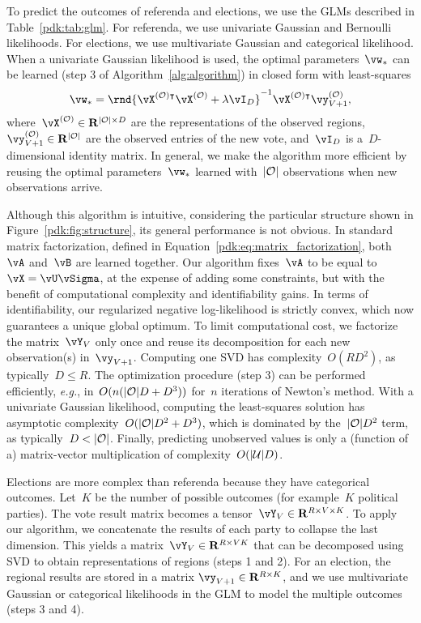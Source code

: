 To predict the outcomes of referenda and elections, we use the GLMs described in Table~\ref{pdk:tab:glm}.
For referenda, we use univariate Gaussian and Bernoulli likelihoods.
For elections, we use multivariate Gaussian and categorical likelihood.
When a univariate Gaussian likelihood is used, the optimal parameters~$\vw_*$ can be learned (step 3 of Algorithm~\ref{alg:algorithm}) in closed form with least-squares
\begin{equation}
	\label{pdk:eq:least_squares}
	\vw_* = \rnd{\vX^{(\Obs)\intercal} \vX^{(\Obs)} + \lambda \vI_D }^{-1}\vX^{(\Obs)\intercal} \vy^{(\Obs)}_{V+1},
\end{equation}
where~$\vX^{(\Obs)} \in \mathbf{R}^{\vert \Obs \vert \times D}$ are the representations of the observed regions,~$\vy^{(\Obs)}_{V+1} \in \mathbf{R}^{\vert \Obs \vert}$ are the observed entries of the new vote, and~$\vI_D$ is a~$D$-dimensional identity matrix.
In general, we make the algorithm more efficient by reusing the optimal parameters~$\vw_*$ learned with~$\vert \mathcal{O} \vert$ observations when new observations arrive.

Although this algorithm is intuitive, considering the particular structure shown in Figure~\ref{pdk:fig:structure}, its general performance is not obvious.
In standard matrix factorization, defined in Equation~\eqref{pdk:eq:matrix_factorization}, both~$\vA$ and~$\vB$ are learned together.
Our algorithm fixes~$\vA$ to be equal to~$\vX = \vU \vSigma$, at the expense of adding some constraints, but with the benefit of computational complexity and identifiability gains.
In terms of identifiability, our regularized negative log-likelihood is strictly convex, which now guarantees a unique global optimum.
To limit computational cost, we factorize the matrix~$\vY_V$ only once and reuse its decomposition for each new observation(s) in~$\vy_{V+1}$.
Computing one SVD has complexity~$O(RD^2)$, as typically~$D \leq R$.
The optimization procedure (step 3) can be performed efficiently, \textit{e.g.}, in~$ O(n (\vert \mathcal{O} \vert D + D^3))$ for~$n$ iterations of Newton's method.
With a univariate Gaussian likelihood, computing the least-squares solution has asymptotic complexity~$O(\vert \mathcal{O} \vert D^2 + D^3)$, which is dominated by the~$\vert \mathcal{O} \vert D^2$ term, as typically~$D < \vert \mathcal{O} \vert$.
Finally, predicting unobserved values is only a (function of a) matrix-vector multiplication of complexity~$O(\vert \mathcal{U} \vert D)$.

Elections are more complex than referenda because they have categorical outcomes.
Let~$K$ be the number of possible outcomes (for example~$K$ political parties).
The vote result matrix becomes a tensor~$\vY_V \in \mathbf{R}^{R \times V \times K}$.
To apply our algorithm, we concatenate the results of each party to collapse the last dimension.
This yields a matrix~$\vY_V \in \mathbf{R}^{R \times VK}$ that can be decomposed using SVD to obtain representations of regions (steps 1 and 2).
For an election, the regional results are stored in a matrix \mbox{$\vy_{V+1} \in \mathbf{R}^{R \times K}$}, and we use multivariate Gaussian or categorical likelihoods in the GLM to model the multiple outcomes (steps 3 and 4).

